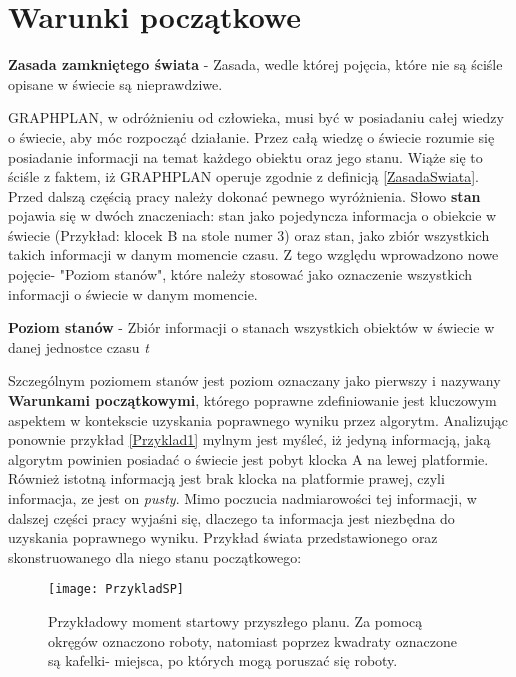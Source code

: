 \section{Warunki początkowe}
    \label{RozdzialWarunkiPoczatkowe}
    \begin{definition}
        \label{ZasadaSwiata}
        \textbf{Zasada zamkniętego świata} - Zasada, wedle której pojęcia, które nie są ściśle opisane w świecie są nieprawdziwe.
    \end{definition}
    GRAPHPLAN, w odróżnieniu od człowieka, musi być w posiadaniu całej wiedzy o świecie, aby móc rozpocząć działanie. Przez całą wiedzę o świecie rozumie się
    posiadanie informacji na temat każdego obiektu oraz jego stanu. Wiąże się to ściśle z faktem,
    iż GRAPHPLAN operuje zgodnie z definicją \ref{ZasadaSwiata}. 
    Przed dalszą częścią pracy należy dokonać pewnego wyróżnienia. Słowo \textbf{stan} pojawia się w dwóch znaczeniach:
    stan jako pojedyncza informacja o obiekcie w świecie (Przykład: klocek B na stole numer 3) oraz stan, jako zbiór wszystkich takich informacji w danym momencie czasu.
    Z tego względu wprowadzono nowe pojęcie- "Poziom stanów", które należy stosować jako oznaczenie wszystkich informacji o świecie w danym momencie.
    \begin{definition}
        \label{PoziomStanow}
        \textbf{Poziom stanów} - Zbiór informacji o stanach wszystkich obiektów w świecie w danej jednostce czasu \textit{t}
    \end{definition}
    Szczególnym poziomem stanów jest poziom oznaczany jako pierwszy i nazywany \textbf{Warunkami początkowymi}, którego poprawne zdefiniowanie jest kluczowym aspektem w kontekscie
    uzyskania poprawnego wyniku przez algorytm.
    Analizując ponownie przykład \ref{Przyklad1} mylnym jest myśleć, iż jedyną informacją, jaką algorytm powinien posiadać o świecie jest pobyt klocka A na lewej platformie. Również
    istotną informacją jest brak klocka na platformie prawej, czyli informacja, ze jest on \textit{pusty}. Mimo poczucia nadmiarowości tej informacji, w dalszej części pracy wyjaśni
    się, dlaczego ta informacja jest niezbędna do uzyskania poprawnego wyniku.
    Przykład świata przedstawionego oraz skonstruowanego dla niego stanu początkowego:
    \begin{figure}[H]
        \texttt{[image: PrzykladSP]}
        \centering
        \caption{Przykładowy moment startowy przyszłego planu. Za pomocą okręgów oznaczono roboty, natomiast poprzez kwadraty oznaczone są kafelki- miejsca,
        po których mogą poruszać się roboty.}
        \label{PrzykladSP}
    \end{figure}
